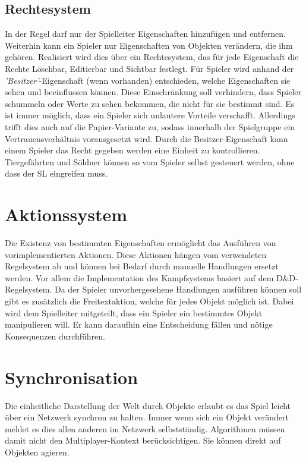 \subsection{Rechtesystem}
\label{sec:Rechtesystem}
In der Regel darf nur der Spielleiter Eigenschaften hinzufügen und entfernen. Weiterhin kann ein Spieler nur Eigenschaften von Objekten verändern, die ihm gehören. Realisiert wird dies über ein Rechtesystem, das für jede Eigenschaft die Rechte Löschbar, Editierbar und Sichtbar festlegt. Für Spieler wird anhand der \emph{'Besitzer'}-Eigenschaft (wenn vorhanden) entschieden, welche Eigenschaften sie sehen und beeinflussen können.\newline
Diese Einschränkung soll verhindern, dass Spieler schummeln oder Werte zu sehen bekommen, die nicht für sie bestimmt sind. Es ist immer möglich, dass ein Spieler sich unlautere Vorteile verschafft. Allerdings trifft dies auch auf die Papier-Variante zu, sodass innerhalb der Spielgruppe ein Vertrauensverhältnis vorausgesetzt wird.\newline
Durch die Besitzer-Eigenschaft kann einem Spieler das Recht gegeben werden eine Einheit zu kontrollieren. Tiergefährten und Söldner können so vom Spieler selbst gesteuert werden, ohne dass der SL eingreifen muss.


\section{Aktionssystem}
\label{sec:Aktionssystem}
Die Existenz von bestimmten Eigenschaften ermöglicht das Ausführen von vorimplementierten Aktionen. Diese Aktionen hängen vom verwendeten Regelsystem ab und können bei Bedarf durch manuelle Handlungen ersetzt werden. Vor allem die Implementation des Kampfsystems basiert auf dem D\&D-Regelsystem.\newline
Da der Spieler unvorhergesehene Handlungen ausführen können soll gibt es zusätzlich die Freitextaktion, welche für jedes Objekt möglich ist. Dabei wird dem Spielleiter mitgeteilt, dass ein Spieler ein bestimmtes Objekt manipulieren will. Er kann daraufhin eine Entscheidung fällen und nötige Konsequenzen durchführen.

\section{Synchronisation}
Die einheitliche Darstellung der Welt durch Objekte erlaubt es das Spiel leicht über ein Netzwerk synchron zu halten. Immer wenn sich ein Objekt verändert meldet es dies allen anderen im Netzwerk selbstständig. Algorithmen müssen damit nicht den Multiplayer-Kontext berücksichtigen. Sie können direkt auf Objekten agieren.

